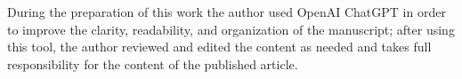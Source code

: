 During the preparation of this work the author used OpenAI ChatGPT in order to improve the clarity, readability, and organization of the manuscript; after using this tool, the author reviewed and edited the content as needed and takes full responsibility for the content of the published article.
